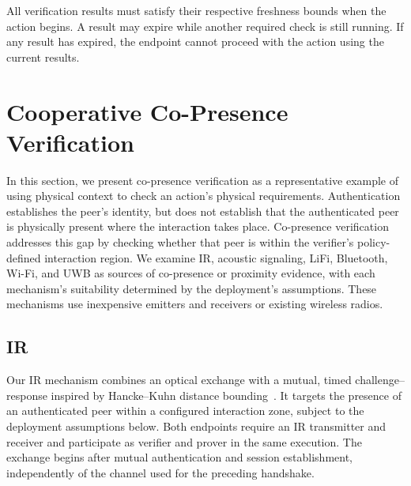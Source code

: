 \documentclass[sigconf,authordraft]{acmart}
\begin{document}
All verification results must satisfy their respective freshness bounds when the action begins.
A result may expire while another required check is still running.
If any result has expired, the endpoint cannot proceed with the action using the current results.

\section{Cooperative Co-Presence Verification}
\label{sec:mechanisms}

In this section, we present co-presence verification as a representative example of using physical context to check an action's physical requirements.
Authentication establishes the peer's identity, but does not establish that the authenticated peer is physically present where the interaction takes place.
Co-presence verification addresses this gap by checking whether that peer is within the verifier's policy-defined interaction region.
We examine IR, acoustic signaling, LiFi, Bluetooth, Wi-Fi, and UWB as sources of co-presence or proximity evidence, with each mechanism's suitability determined by the deployment's assumptions.
These mechanisms use inexpensive emitters and receivers or existing wireless radios.

\subsection{IR}
\label{sec:mechanism-ir}

Our IR mechanism combines an optical exchange with a mutual, timed challenge--response inspired by Hancke--Kuhn distance bounding~\cite{hancke2005rfid}.
It targets the presence of an authenticated peer within a configured interaction zone, subject to the deployment assumptions below.
Both endpoints require an IR transmitter and receiver and participate as verifier and prover in the same execution.
The exchange begins after mutual authentication and session establishment, independently of the channel used for the preceding handshake.
\end{document}

